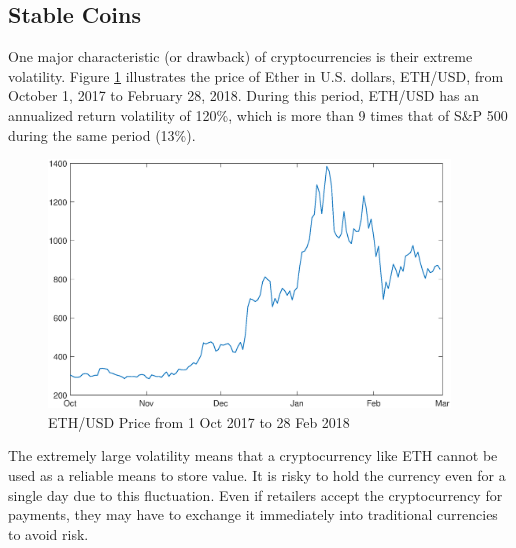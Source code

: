 \documentclass[11pt]{article}%
\numberwithin{equation}{section}
\theoremstyle{plain}
\begin{document}
\subsection{Stable Coins}

One major characteristic (or drawback) of cryptocurrencies is their extreme volatility.
Figure \ref{fig:ethprice} illustrates the price of Ether in U.S. dollars, ETH/USD, from October 1, 2017 to February 28, 2018. During this period, ETH/USD has an annualized return volatility of 120\%, which is more than 9 times that of S\&P 500 during the same period (13\%).





\begin{figure}[!htb]
\begin{centering}
\includegraphics[width=0.95\textwidth]{eth_price}
\par\end{centering}
\caption{ETH/USD Price from 1 Oct 2017 to 28 Feb 2018}\label{fig:ethprice}
\end{figure}


The extremely large volatility means that a cryptocurrency like ETH cannot be used as a reliable means to store value. It is risky to hold the currency even for a single day due to this fluctuation. Even if retailers accept the cryptocurrency for payments, they may have to exchange it immediately into traditional currencies to avoid risk.


\end{document}
